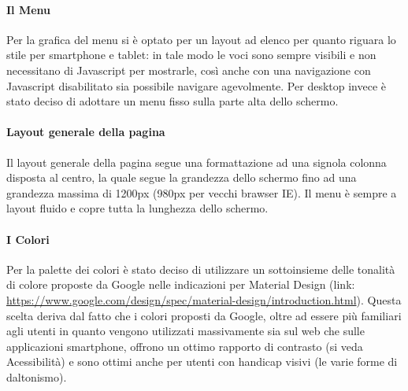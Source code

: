 \paragraph*{Il Menu}
Per la grafica del menu si è optato per un layout ad elenco per quanto riguara lo stile per smartphone e tablet: in tale modo le voci sono sempre visibili e non necessitano di Javascript per mostrarle, così anche con una navigazione con Javascript disabilitato sia possibile navigare agevolmente.
Per desktop invece è stato deciso di adottare un menu fisso sulla parte alta dello schermo.

\paragraph*{Layout generale della pagina}
Il layout generale della pagina segue una formattazione ad una signola colonna disposta al centro, la quale segue la grandezza dello schermo fino ad una grandezza massima di 1200px (980px per vecchi brawser IE).
Il menu è sempre a layout fluido e copre tutta la lunghezza dello schermo.

\paragraph*{I Colori}
Per la palette dei colori è stato deciso di utilizzare un sottoinsieme delle tonalità di colore proposte da Google nelle indicazioni per Material Design (link:  \url{https://www.google.com/design/spec/material-design/introduction.html}). Questa scelta deriva dal fatto che i colori proposti da Google, oltre ad essere più familiari agli utenti in quanto vengono utilizzati massivamente sia sul web che sulle applicazioni smartphone, offrono un ottimo rapporto di contrasto (si veda Acessibilità) e sono ottimi anche per utenti con handicap visivi (le varie forme di daltonismo).
